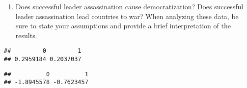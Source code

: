 \documentclass[
]{article}
\newenvironment{Shaded}{\begin{snugshade}}{\end{snugshade}}
\newcommand{\DataTypeTok}[1]{\textcolor[rgb]{0.13,0.29,0.53}{#1}}
\newcommand{\DecValTok}[1]{\textcolor[rgb]{0.00,0.00,0.81}{#1}}
\newcommand{\KeywordTok}[1]{\textcolor[rgb]{0.13,0.29,0.53}{\textbf{#1}}}
\newcommand{\NormalTok}[1]{#1}
\newcommand{\OperatorTok}[1]{\textcolor[rgb]{0.81,0.36,0.00}{\textbf{#1}}}
\newcommand{\StringTok}[1]{\textcolor[rgb]{0.31,0.60,0.02}{#1}}
\providecommand{\tightlist}{%
  \setlength{\itemsep}{0pt}\setlength{\parskip}{0pt}}
\begin{document}
\begin{enumerate}
\def\labelenumi{\arabic{enumi}.}
\setcounter{enumi}{4}
\tightlist
\item
  Does successful leader assassination cause democratization? Does
  successful leader assassination lead countries to war? When analyzing
  these data, be sure to state your assumptions and provide a brief
  interpretation of the results.
\end{enumerate}

\begin{Shaded}
\end{Shaded}

\begin{verbatim}
##         0         1 
## 0.2959184 0.2037037
\end{verbatim}

\begin{Shaded}
\end{Shaded}

\begin{verbatim}
##          0          1 
## -1.8945578 -0.7623457
\end{verbatim}
\end{document}
